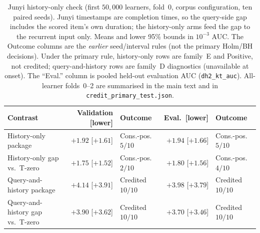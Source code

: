 \begin{table}[tbp]
\caption{Junyi history-only check (first $50{,}000$ learners, fold~0,
corpus configuration, ten paired seeds). Junyi timestamps are completion
times, so the query-side gap includes the scored item's own duration;
the history-only arms feed the gap to the recurrent input only. Means
and lower 95\% bounds in $10^{-3}$ AUC. The Outcome columns are the
\emph{earlier} seed/interval rules (not the primary Holm/BH decisions).
Under the primary rule, history-only rows are family~E and Positive,
not credited; query-and-history rows are family~D diagnostics
(unavailable at onset). The ``Eval.'' column is pooled held-out
evaluation AUC (\texttt{dh2\_kt\_auc}). All-learner folds~0--2 are
summarised in the main text and in
\texttt{credit\_primary\_test.json}.}
\label{tab:junyi-history}
\centering
\scriptsize
\setlength{\tabcolsep}{3pt}
\begin{tabular}{@{}lrlrl@{}}
\toprule
Contrast & Validation [lower] & Outcome & Eval.\ [lower] & Outcome \\
\midrule
History-only package & $+1.92$ [$+1.61$] & Cons.-pos. $5/10$ & $+1.94$ [$+1.66$] & Cons.-pos. $5/10$ \\
History-only gap vs.\ T-zero & $+1.75$ [$+1.52$] & Cons.-pos. $2/10$ & $+1.80$ [$+1.56$] & Cons.-pos. $4/10$ \\
Query-and-history package & $+4.14$ [$+3.91$] & Credited $10/10$ & $+3.98$ [$+3.79$] & Credited $10/10$ \\
Query-and-history gap vs.\ T-zero & $+3.90$ [$+3.62$] & Credited $10/10$ & $+3.70$ [$+3.46$] & Credited $10/10$ \\
\bottomrule
\end{tabular}
\end{table}
